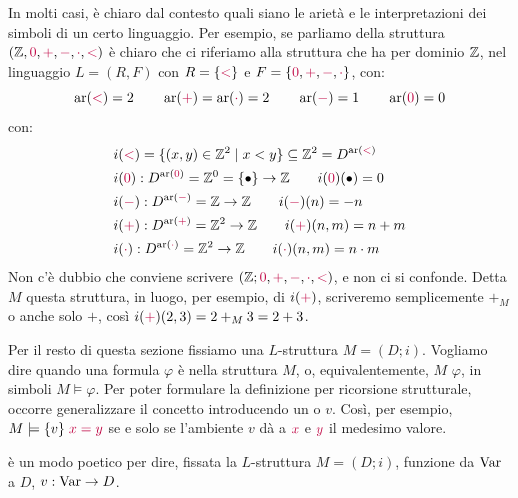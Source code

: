 \begin{note}
    In molti casi, è chiaro dal contesto quali siano le arietà e le interpretazioni dei simboli di un certo linguaggio. Per esempio, se parliamo della struttura
    $(\mathbb Z, \textcolor{purple}{0}, \textcolor{purple}{+},\textcolor{purple}{-}, \textcolor{purple}{\cdot}, \textcolor{purple}{<})$ è chiaro che ci riferiamo alla struttura che ha per dominio $\mathbb Z$,
    nel linguaggio $L = (R,F)$ con $R = \{\textcolor{purple}{<}\}$ e $F = \{\textcolor{purple}{0}, \textcolor{purple}{+},\textcolor{purple}{-}, \textcolor{purple}{\cdot}\}$, con:
    \[ \operatorname{ar}(\textcolor{purple}{<}) = 2 \qquad \operatorname{ar}(\textcolor{purple}{+}) = \operatorname{ar}(\textcolor{purple}{\cdot}) = 2 \qquad \operatorname{ar}(\textcolor{purple}{-}) = 1 \qquad \operatorname{ar}(\textcolor{purple}{0}) = 0
    \]
    con:
    \begin{align*}
        &i(\textcolor{purple}{<}) = \{ (x,y) \in \mathbb Z^2 \mid x < y \} \subseteq \mathbb Z^2 = D^{\operatorname{ar}(\textcolor{purple}{<})} \\
        &i(\textcolor{purple}{0}) : D^{\operatorname{ar}(\textcolor{purple}{0})} = \mathbb Z^0 =\{\bullet\} \to \mathbb Z \qquad i(\textcolor{purple}{0})(\bullet) = 0\\
        &i(\textcolor{purple}{-}) : D^{\operatorname{ar}(\textcolor{purple}{-})} = \mathbb Z \to \mathbb Z \qquad i(\textcolor{purple}{-})(n) = -n \\
        &i(\textcolor{purple}{+}) : D^{\operatorname{ar}(\textcolor{purple}{+})} = \mathbb Z^2 \to \mathbb Z \qquad i(\textcolor{purple}{+})(n,m) = n+m \\
        &i(\textcolor{purple}{\cdot}) : D^{\operatorname{ar}(\textcolor{purple}{\cdot})} = \mathbb Z^2 \to \mathbb Z \qquad i(\textcolor{purple}{\cdot})(n,m) = n \cdot m
    \end{align*}
    Non c'è dubbio che conviene scrivere $(\mathbb Z; \textcolor{purple}{0}, \textcolor{purple}{+},\textcolor{purple}{-}, \textcolor{purple}{\cdot}, \textcolor{purple}{<})$, e non ci si confonde.
    Detta $M$ questa struttura, in luogo, per esempio, di $i(\textcolor{purple}{+})$, scriveremo semplicemente $+_M$ o anche solo $+$, così $i(\textcolor{purple}{+})(2,3) = 2 +_M 3 = 2+3$.
\end{note}

Per il resto di questa sezione fissiamo una $L$-struttura $M = (D;i)$. Vogliamo dire quando una formula $\varphi$ è  nella struttura $M$, o, equivalentemente, $M$  $\varphi$,
in simboli $M \models \varphi$. Per poter formulare la definizione per ricorsione strutturale, occorre generalizzare il concetto introducendo un  o  $v$.
Così, per esempio, $M \models \{v\} \; \textcolor{purple}{x = y}$ se e solo se l'ambiente $v$ dà a $\textcolor{purple}{x}$ e $\textcolor{purple}{y}$ il medesimo valore.

\begin{definition}
     è un modo poetico per dire, fissata la $L$-struttura $M = (D;i)$, funzione da $\operatorname{Var}$ a $D$, $v : \operatorname{Var} \to D$.
\end{definition}


